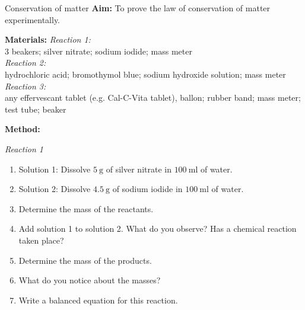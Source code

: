             \begin{i_experiment}{Conservation of matter}
            \nopagebreak
            \label{m38711*eip-453}\noindent{}\textbf{Aim:}
To prove the law of conservation of matter experimentally.
\par 
\label{m38711*eip792}\noindent{}\textbf{Materials:}
\textsl{Reaction 1:} \\
3 beakers; silver nitrate; sodium iodide; mass meter \\
\textsl{Reaction 2:} \\
 hydrochloric acid; bromothymol blue; sodium hydroxide solution; mass meter \\
 \textsl{Reaction 3:} \\
any effervescant tablet (e.g. Cal-C-Vita tablet), ballon; rubber band; mass meter; test tube; beaker
\par 
\label{m38711*eip-153}
	\par
      \label{m38711*id72432}\noindent
\textbf{Method:} \\
\begin{minipage}{.7\textwidth}
\textsl{Reaction 1} 
\label{m38711*id6342}\begin{enumerate}[noitemsep, label=\textbf{\arabic*}. ] 
            \item Solution 1: Dissolve $5~\text{g}$ of silver nitrate in $100~\text{ml}$ of water.
\item Solution 2: Dissolve $4.5~\text{g}$ of sodium iodide in $100~\text{ml}$ of water.
\item Determine the mass of the reactants.
\item Add solution 1 to solution 2. What do you observe? Has a chemical reaction taken place? 
\item Determine the mass of the products. 
\item What do you notice about the masses?
\item Write a balanced equation for this reaction.
\end{enumerate}
\end{minipage}
\begin{minipage}{.3\textwidth}
 \begin{center}
\end{center}
\end{minipage}
\end{i_experiment}
